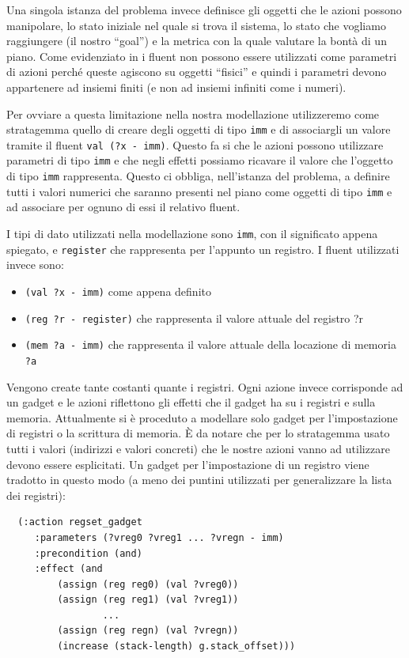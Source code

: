 Una singola istanza del problema invece definisce gli oggetti che le
azioni possono manipolare, lo stato iniziale nel quale si trova il
sistema, lo stato che vogliamo raggiungere (il nostro ``goal'') e
la metrica con la quale valutare la bontà di un piano.  Come
evidenziato in \cite{fox-03} i fluent non possono essere utilizzati
come parametri di azioni perché queste agiscono su oggetti ``fisici''
e quindi i parametri devono appartenere ad insiemi finiti (e non ad
insiemi infiniti come i numeri). 

Per ovviare a questa limitazione nella nostra modellazione
utilizzeremo come stratagemma quello di creare degli oggetti di tipo
\lstinline{imm} e di associargli un valore tramite il fluent
\lstinline{val (?x - imm)}. Questo fa si che le azioni possono
utilizzare parametri di tipo \lstinline{imm} e che negli effetti
possiamo ricavare il valore che l'oggetto di tipo \lstinline{imm}
rappresenta. Questo ci obbliga, nell'istanza del problema, a definire
tutti i valori numerici che saranno presenti nel piano come oggetti di
tipo \lstinline{imm} e ad associare per ognuno di essi il relativo
fluent.

I tipi di dato utilizzati nella modellazione sono \lstinline{imm}, con
il significato appena spiegato, e \lstinline{register} che rappresenta
per l'appunto un registro. I fluent utilizzati invece sono:

\begin{itemize}
\item \lstinline{(val ?x - imm)} come appena definito
\item \lstinline{(reg ?r - register)} che rappresenta il valore attuale del
  registro ?r
\item \lstinline{(mem ?a - imm)} che rappresenta il valore attuale
  della locazione di memoria \lstinline{?a}
\end{itemize}

Vengono create tante costanti quante i registri.  Ogni azione invece
corrisponde ad un gadget e le azioni riflettono gli effetti che il
gadget ha su i registri e sulla memoria.  Attualmente si è proceduto a
modellare solo gadget per l'impostazione di registri o la scrittura di
memoria. È da notare che per lo stratagemma usato tutti i valori
(indirizzi e valori concreti) che le nostre azioni vanno ad utilizzare
devono essere esplicitati. Un gadget per l'impostazione di un registro
viene tradotto in questo modo (a meno dei puntini utilizzati per
generalizzare la lista dei registri):

\begin{lstlisting}
  (:action regset_gadget
	 :parameters (?vreg0 ?vreg1 ... ?vregn - imm)
	 :precondition (and)
	 :effect (and
	 	 (assign (reg reg0) (val ?vreg0))
	 	 (assign (reg reg1) (val ?vreg1))
                 ...
	 	 (assign (reg regn) (val ?vregn))
		 (increase (stack-length) g.stack_offset)))
\end{lstlisting}

